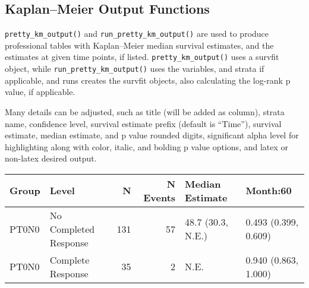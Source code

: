 \documentclass[table]{article}
\newenvironment{Shaded}{\begin{snugshade}}{\end{snugshade}}
\newcommand{\CommentTok}[1]{\textcolor[rgb]{0.56,0.35,0.01}{\textit{#1}}}
\newcommand{\DataTypeTok}[1]{\textcolor[rgb]{0.13,0.29,0.53}{#1}}
\newcommand{\DecValTok}[1]{\textcolor[rgb]{0.00,0.00,0.81}{#1}}
\newcommand{\KeywordTok}[1]{\textcolor[rgb]{0.13,0.29,0.53}{\textbf{#1}}}
\newcommand{\NormalTok}[1]{#1}
\newcommand{\OperatorTok}[1]{\textcolor[rgb]{0.81,0.36,0.00}{\textbf{#1}}}
\newcommand{\StringTok}[1]{\textcolor[rgb]{0.31,0.60,0.02}{#1}}
\begin{document}
\hypertarget{kaplanmeier-output-functions}{%
\subsection{Kaplan--Meier Output
Functions}\label{kaplanmeier-output-functions}}

\texttt{pretty\_km\_output()} and \texttt{run\_pretty\_km\_output()} are
used to produce professional tables with Kaplan--Meier median survival
estimates, and the estimates at given time points, if listed.
\texttt{pretty\_km\_output()} uses a survfit object, while
\texttt{run\_pretty\_km\_output()} uses the variables, and strata if
applicable, and runs creates the survfit objects, also calculating the
log-rank p value, if applicable.

Many details can be adjusted, such as title (will be added as column),
strata name, confidence level, survival estimate prefix (default is
``Time''), survival estimate, median estimate, and p value rounded
digits, significant alpha level for highlighting along with color,
italic, and bolding p value options, and latex or non-latex desired
output.

\begin{Shaded}
\end{Shaded}

\begin{tabular}{l|l|r|r|l|l}
\hline
Group & Level & N & N Events & Median Estimate & Month:60\\
\hline
PT0N0 & No Completed Response & 131 & 57 & 48.7 (30.3, N.E.) & 0.493 (0.399, 0.609)\\
\hline
PT0N0 & Complete Response & 35 & 2 & N.E. & 0.940 (0.863, 1.000)\\
\hline
\end{tabular}
\end{document}
